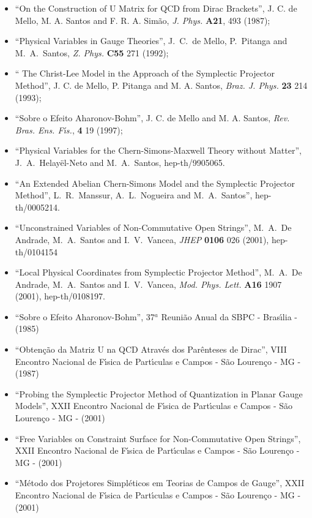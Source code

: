 \documentclass[a4paper,thmsa,12pt]{report}
\begin{document}
\begin{itemize}

\item ``On the Construction of U Matrix for QCD from Dirac Brackets'', 
J. C. de Mello, M. A. Santos and F. R. A. Sim\~ao, 
{\it J. Phys.} {\bf A21}, 493 (1987);

\item ``Physical Variables in Gauge Theories'', 
 J.~C.~de Mello, P.~Pitanga and M.~A.~Santos,
{\it Z. Phys.} {\bf C55} 271 (1992);

\item `` The Christ-Lee Model in the Approach of the Symplectic Projector Method'', 
J. C. de Mello, P. Pitanga and M. A. Santos,
{\it Braz. J. Phys.} {\bf 23} 214 (1993);

\item ``Sobre o Efeito Aharonov-Bohm'',
J. C. de Mello and M. A. Santos,
{\it Rev. Bras. Ens. F\'{\i}s.}, {\bf 4} 19 (1997);

\item ``Physical Variables for the Chern-Simons-Maxwell Theory without Matter'', 
J.~A.~He\-la\-y\"el-Neto and M.~A.~Santos, 
hep-th/9905065.

\item ``An Extended Abelian Chern-Simons Model and the Symplectic Projector Method'',
L.~R.~Manssur, A.~L.~Nogueira and M.~A.~Santos'', 
hep-th/0005214.

\item ``Unconstrained Variables of Non-Commutative Open Strings'', 
M.~A.~De Andrade, M.~A.~Santos and I.~V.~Vancea, {\it JHEP} {\bf 0106} 026 (2001), 
hep-th/0104154

\item ``Local Physical Coordinates from Symplectic Projector Method'', 
M.~A.~De Andrade, M.~A.~Santos and I.~V.~Vancea, 
{\it Mod. Phys. Lett.} {\bf A16} 1907 (2001), 
hep-th/0108197.

\item ``Sobre o Efeito Aharonov-Bohm'', 37$^a$ Reuni\~{a}o Anual da SBPC - Bras\'{\i}lia - (1985)

\item ``Obten\c{c}\~{a}o da Matriz U na QCD Atrav\'{e}s dos Par\^{e}nteses de Dirac'', 
VIII Encontro Nacional de F\'{\i}sica de Part\'{\i}culas e Campos - S\~ao Louren\c co - MG - (1987)

\item ``Probing the Symplectic Projector Method of Quantization in Planar Gauge Models'',
XXII Encontro Nacional de F\'{\i}sica de Part\'{\i}culas e Campos - S\~ao Louren\c co - MG - (2001) 

\item ``Free Variables on Constraint Surface for Non-Commutative Open Strings'',
XXII Encontro Nacional de F\'{\i}sica de Part\'{\i}culas e Campos - S\~ao Louren\c co - MG - (2001) 

\item ``M\'etodo dos Projetores Simpl\'eticos em Teorias de Campos de Gauge'',
XXII Encontro Nacional de F\'{\i}sica de Part\'{\i}culas e Campos - S\~ao Louren\c co - MG - (2001) 


\end{itemize}
\end{document}
